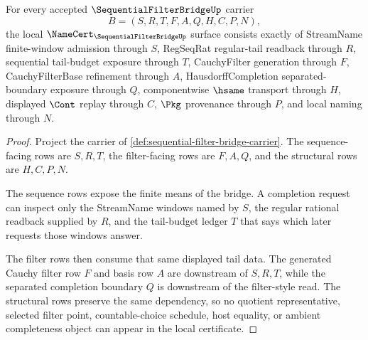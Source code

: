 \begin{theorem}
\label{thm:sequential-filter-bridge-namecert-obligations}
For every accepted $\SequentialFilterBridgeUp$ carrier
$$
B=(S,R,T,F,A,Q,H,C,P,N),
$$
the local $\NameCert_{\SequentialFilterBridgeUp}$ surface consists exactly of StreamName finite-window admission through $S$, RegSeqRat regular-tail readback through $R$, sequential tail-budget exposure through $T$, CauchyFilter generation through $F$, CauchyFilterBase refinement through $A$, HausdorffCompletion separated-boundary exposure through $Q$, componentwise $\hsame$ transport through $H$, displayed $\Cont$ replay through $C$, $\Pkg$ provenance through $P$, and local naming through $N$.
\end{theorem}
\begin{proof}
Project the carrier of \autoref{def:sequential-filter-bridge-carrier}. The sequence-facing rows are $S,R,T$, the filter-facing rows are $F,A,Q$, and the structural rows are $H,C,P,N$.

The sequence rows expose the finite means of the bridge. A completion request can inspect only the StreamName windows named by $S$, the regular rational readback supplied by $R$, and the tail-budget ledger $T$ that says which later requests those windows answer.

The filter rows then consume that same displayed tail data. The generated Cauchy filter row $F$ and basis row $A$ are downstream of $S,R,T$, while the separated completion boundary $Q$ is downstream of the filter-style read. The structural rows preserve the same dependency, so no quotient representative, selected filter point, countable-choice schedule, host equality, or ambient completeness object can appear in the local certificate.
\end{proof}

